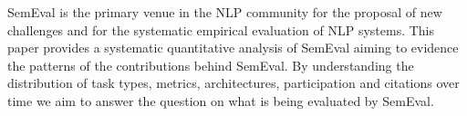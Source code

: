 SemEval is the primary venue in the NLP community for the proposal of new challenges and for the systematic empirical evaluation of NLP systems. This paper provides a systematic quantitative analysis of SemEval aiming to evidence the patterns of the contributions behind SemEval. By understanding the distribution of task types, metrics, architectures, participation and citations over time we aim to answer the question on what is being evaluated by SemEval.
